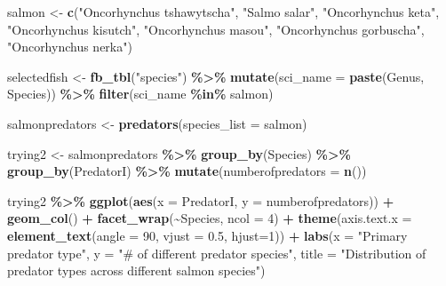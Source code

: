 \documentclass[
]{article}
\newenvironment{Shaded}{\begin{snugshade}}{\end{snugshade}}
\newcommand{\AttributeTok}[1]{\textcolor[rgb]{0.13,0.29,0.53}{#1}}
\newcommand{\DecValTok}[1]{\textcolor[rgb]{0.00,0.00,0.81}{#1}}
\newcommand{\FloatTok}[1]{\textcolor[rgb]{0.00,0.00,0.81}{#1}}
\newcommand{\FunctionTok}[1]{\textcolor[rgb]{0.13,0.29,0.53}{\textbf{#1}}}
\newcommand{\NormalTok}[1]{#1}
\newcommand{\OtherTok}[1]{\textcolor[rgb]{0.56,0.35,0.01}{#1}}
\newcommand{\SpecialCharTok}[1]{\textcolor[rgb]{0.81,0.36,0.00}{\textbf{#1}}}
\newcommand{\StringTok}[1]{\textcolor[rgb]{0.31,0.60,0.02}{#1}}
\begin{document}
\begin{Shaded}
\begin{Highlighting}[]
\NormalTok{salmon }\OtherTok{\textless{}{-}} \FunctionTok{c}\NormalTok{(}\StringTok{"Oncorhynchus tshawytscha"}\NormalTok{, }\StringTok{"Salmo salar"}\NormalTok{, }\StringTok{"Oncorhynchus keta"}\NormalTok{, }\StringTok{"Oncorhynchus kisutch"}\NormalTok{,  }\StringTok{"Oncorhynchus masou"}\NormalTok{, }\StringTok{"Oncorhynchus gorbuscha"}\NormalTok{, }\StringTok{"Oncorhynchus nerka"}\NormalTok{)}

\NormalTok{selectedfish }\OtherTok{\textless{}{-}} \FunctionTok{fb\_tbl}\NormalTok{(}\StringTok{"species"}\NormalTok{) }\SpecialCharTok{\%\textgreater{}\%} 
  \FunctionTok{mutate}\NormalTok{(}\AttributeTok{sci\_name =} \FunctionTok{paste}\NormalTok{(Genus, Species)) }\SpecialCharTok{\%\textgreater{}\%}
  \FunctionTok{filter}\NormalTok{(sci\_name }\SpecialCharTok{\%in\%}\NormalTok{ salmon)}


\NormalTok{salmonpredators }\OtherTok{\textless{}{-}} \FunctionTok{predators}\NormalTok{(}\AttributeTok{species\_list =}\NormalTok{ salmon)}


\NormalTok{trying2 }\OtherTok{\textless{}{-}}\NormalTok{ salmonpredators }\SpecialCharTok{\%\textgreater{}\%}
  \FunctionTok{group\_by}\NormalTok{(Species) }\SpecialCharTok{\%\textgreater{}\%}
  \FunctionTok{group\_by}\NormalTok{(PredatorI) }\SpecialCharTok{\%\textgreater{}\%}
  \FunctionTok{mutate}\NormalTok{(}\AttributeTok{numberofpredators =} \FunctionTok{n}\NormalTok{())}


\NormalTok{  trying2 }\SpecialCharTok{\%\textgreater{}\%}
  \FunctionTok{ggplot}\NormalTok{(}\FunctionTok{aes}\NormalTok{(}\AttributeTok{x =}\NormalTok{ PredatorI, }\AttributeTok{y =}\NormalTok{ numberofpredators)) }\SpecialCharTok{+}
  \FunctionTok{geom\_col}\NormalTok{() }\SpecialCharTok{+}
  \FunctionTok{facet\_wrap}\NormalTok{(}\SpecialCharTok{\textasciitilde{}}\NormalTok{Species, }\AttributeTok{ncol =} \DecValTok{4}\NormalTok{) }\SpecialCharTok{+} 
    \FunctionTok{theme}\NormalTok{(}\AttributeTok{axis.text.x =} \FunctionTok{element\_text}\NormalTok{(}\AttributeTok{angle =} \DecValTok{90}\NormalTok{, }\AttributeTok{vjust =} \FloatTok{0.5}\NormalTok{, }\AttributeTok{hjust=}\DecValTok{1}\NormalTok{)) }\SpecialCharTok{+}
    \FunctionTok{labs}\NormalTok{(}\AttributeTok{x =} \StringTok{"Primary predator type"}\NormalTok{, }\AttributeTok{y =} \StringTok{"\# of different predator species"}\NormalTok{, }\AttributeTok{title =} \StringTok{"Distribution of predator types across different salmon species"}\NormalTok{)}
\end{Highlighting}
\end{Shaded}
\end{document}

